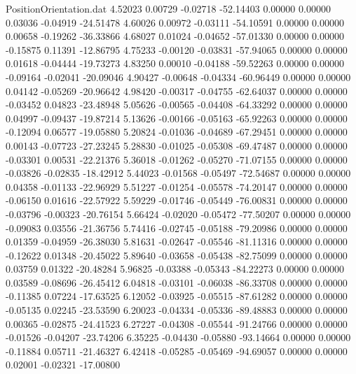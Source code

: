 \begin{filecontents}{PositionOrientation.dat}
   4.52023    0.00729   -0.02718   -52.14403    0.00000    0.00000    0.03036   -0.04919  -24.51478
   4.60026    0.00972   -0.03111   -54.10591    0.00000    0.00000    0.00658   -0.19262  -36.33866
   4.68027    0.01024   -0.04652   -57.01330    0.00000    0.00000   -0.15875    0.11391  -12.86795
   4.75233   -0.00120   -0.03831   -57.94065    0.00000    0.00000    0.01618   -0.04444  -19.73273
   4.83250    0.00010   -0.04188   -59.52263    0.00000    0.00000   -0.09164   -0.02041  -20.09046
   4.90427   -0.00648   -0.04334   -60.96449    0.00000    0.00000    0.04142   -0.05269  -20.96642
   4.98420   -0.00317   -0.04755   -62.64037    0.00000    0.00000   -0.03452    0.04823  -23.48948
   5.05626   -0.00565   -0.04408   -64.33292    0.00000    0.00000    0.04997   -0.09437  -19.87214
   5.13626   -0.00166   -0.05163   -65.92263    0.00000    0.00000   -0.12094    0.06577  -19.05880
   5.20824   -0.01036   -0.04689   -67.29451    0.00000    0.00000    0.00143   -0.07723  -27.23245
   5.28830   -0.01025   -0.05308   -69.47487    0.00000    0.00000   -0.03301    0.00531  -22.21376
   5.36018   -0.01262   -0.05270   -71.07155    0.00000    0.00000   -0.03826   -0.02835  -18.42912
   5.44023   -0.01568   -0.05497   -72.54687    0.00000    0.00000    0.04358   -0.01133  -22.96929
   5.51227   -0.01254   -0.05578   -74.20147    0.00000    0.00000   -0.06150    0.01616  -22.57922
   5.59229   -0.01746   -0.05449   -76.00831    0.00000    0.00000   -0.03796   -0.00323  -20.76154
   5.66424   -0.02020   -0.05472   -77.50207    0.00000    0.00000   -0.09083    0.03556  -21.36756
   5.74416   -0.02745   -0.05188   -79.20986    0.00000    0.00000    0.01359   -0.04959  -26.38030
   5.81631   -0.02647   -0.05546   -81.11316    0.00000    0.00000   -0.12622    0.01348  -20.45022
   5.89640   -0.03658   -0.05438   -82.75099    0.00000    0.00000    0.03759    0.01322  -20.48284
   5.96825   -0.03388   -0.05343   -84.22273    0.00000    0.00000    0.03589   -0.08696  -26.45412
   6.04818   -0.03101   -0.06038   -86.33708    0.00000    0.00000   -0.11385    0.07224  -17.63525
   6.12052   -0.03925   -0.05515   -87.61282    0.00000    0.00000   -0.05135    0.02245  -23.53590
   6.20023   -0.04334   -0.05336   -89.48883    0.00000    0.00000    0.00365   -0.02875  -24.41523
   6.27227   -0.04308   -0.05544   -91.24766    0.00000    0.00000   -0.01526   -0.04207  -23.74206
   6.35225   -0.04430   -0.05880   -93.14664    0.00000    0.00000   -0.11884    0.05711  -21.46327
   6.42418   -0.05285   -0.05469   -94.69057    0.00000    0.00000    0.02001   -0.02321  -17.00800

\end{filecontents}
